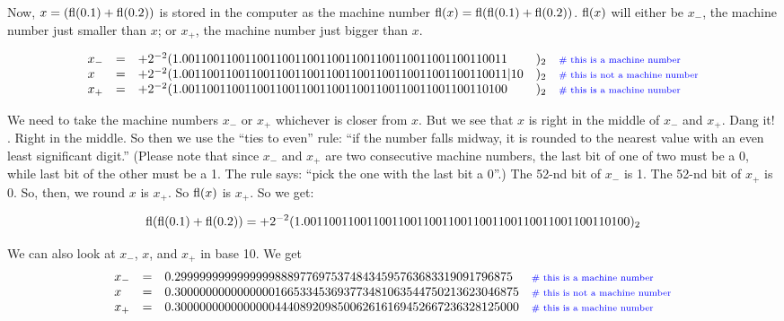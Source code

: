 \documentclass[pdftex,11pt]{article}
\begin{document}
Now, $x = ( \textmd{fl}(0.1) + \textmd{fl}(0.2) )$ is stored in the computer as the machine number 
$\textmd{fl}(x) = \textmd{fl}( \textmd{fl}(0.1) + \textmd{fl}(0.2) )$. 
$\textmd{fl}(x)$ will either be $x_-$, the machine number just smaller than $x$; or $x_+$, the machine number just bigger than $x$.

$$
\begin{array}{lcll}
 \nonumber x_-  & = &  + 2^{-2} ( 1.0011001100110011001100110011001100110011001100110011\phantom{|10}~~~)_2&\textmd{\scriptsize\color{blue}\# this is a machine number} \\
 \nonumber x    & = &  + 2^{-2} ( 1.0011001100110011001100110011001100110011001100110011|10~~~)_2          &\textmd{\scriptsize\color{blue}\# this is not a machine number} \\
 \nonumber x_+  & = &  + 2^{-2} ( 1.0011001100110011001100110011001100110011001100110100\phantom{|10}~~~)_2&\textmd{\scriptsize\color{blue}\# this is a machine number}
\end{array}
$$




We need to take the machine numbers $x_-$ or $x_+$ whichever is closer from
$x$. But we see that $x$ is right in the middle of $x_-$ and $x_+$. Dang it!
\Smiley.  Right in the middle. So then we use the ``ties to even'' rule: ``if
the number falls midway, it is rounded to the nearest value with an even least
significant digit.'' (Please note that since $x_-$ and $x_+$ are two
consecutive machine numbers, the last bit of one of two must be a 0, while last
bit of the other must be a 1. The rule says: ``pick the one with the last bit a
0''.) The 52-nd bit of $x_-$ is 1. The 52-nd bit of $x_+$ is 0. So, then, we
round $x$ is $x_+$. So $\textmd{fl}(x)$ is $x_+$. So we get:


$$\textmd{fl}( \textmd{fl}(0.1) + \textmd{fl}(0.2) ) = + 2^{-2} ( 1.0011001100110011001100110011001100110011001100110100 )_2  $$

We can also look at $x_-$, $x$, and $x_+$ in base 10. We get
$$
\begin{array}{lcll}
 \nonumber x_-  & = &  0.299999999999999988897769753748434595763683319091796875   &\textmd{\scriptsize\color{blue}\# this is a machine number} \\
 \nonumber x    & = &  0.3000000000000000166533453693773481063544750213623046875  &\textmd{\scriptsize\color{blue}\# this is not a machine number} \\
 \nonumber x_+  & = &  0.3000000000000000444089209850062616169452667236328125000  &\textmd{\scriptsize\color{blue}\# this is a machine number}
\end{array}
$$
\end{document}
